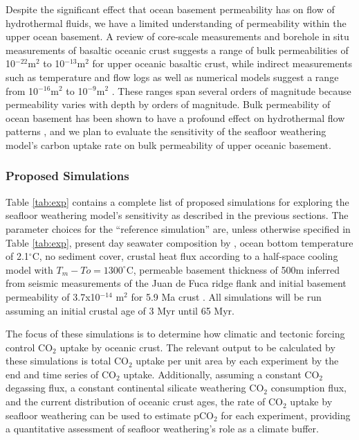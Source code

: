 \documentclass[authoryear,round,12pt]{article}
\begin{document}
Despite the significant effect that ocean basement permeability has on flow
of hydrothermal fluids, we have a limited understanding of
permeability within the upper ocean basement. A review of core-scale
measurements and borehole in situ measurements of basaltic oceanic
crust suggests a range of bulk permeabilities of 10$^{-22}$m$^2$ to
10$^{-13}$m$^2$ for upper oceanic basaltic crust, while indirect
measurements such as temperature and flow logs as well as numerical
models suggest a range from 10$^{-16}$m$^2$ to 10$^{-9}$m$^2$
\citep{fisher1998}. These ranges span several orders of magnitude
because permeability varies with depth by orders of magnitude. Bulk
permeability of ocean basement has been shown to have a profound
effect on hydrothermal flow patterns \citep{wang1996}, and we plan to
evaluate the sensitivity of the seafloor weathering model's carbon
uptake rate on bulk permeability of upper oceanic basement.

\subsubsection{Proposed Simulations}

Table \ref{tab:exp} contains a complete list of proposed simulations
for exploring the seafloor weathering model's sensitivity as described
in the previous sections. The parameter choices for the ``reference
simulation'' are, unless otherwise specified in Table \ref{tab:exp},
present day seawater composition by \citet{nordstrom1979}, ocean
bottom temperature of 2.1$^{\circ}$C, no sediment cover, crustal heat
flux according to a half-space cooling model with $T_m - To =
1300^{\circ}$C, permeable basement thickness of 500m inferred from
seismic measurements of the Juan de Fuca ridge flank \citep{rohr1994}
and initial basement permeability of 3.7x10$^{-14}$ m$^2$ for 5.9 Ma
crust \citep{anderson1982}. All simulations will be run assuming an
initial crustal age of 3 Myr until 65 Myr.

The focus of these simulations is to determine how climatic and
tectonic forcing control CO$_2$ uptake by oceanic crust. The relevant
output to be calculated by these simulations is total CO$_2$ uptake
per unit area by each experiment by the end and time series of CO$_2$
uptake. Additionally, assuming a constant CO$_2$ degassing flux, a
constant continental silicate weathering CO$_2$ consumption flux, and
the current distribution of oceanic crust ages, the rate of CO$_2$
uptake by seafloor weathering can be used to estimate pCO$_2$ for each
experiment, providing a quantitative assessment of seafloor
weathering's role as a climate buffer.
\end{document}
